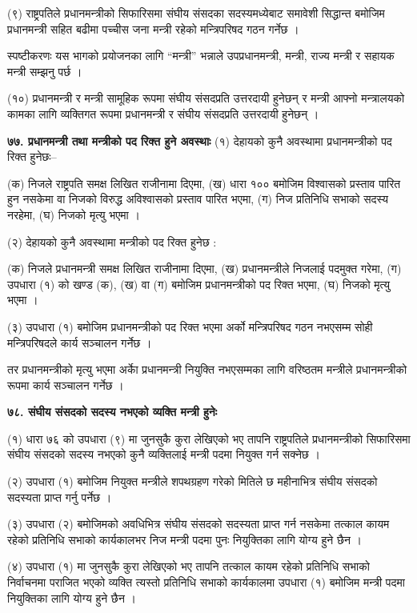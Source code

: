 (९) राष्ट्रपतिले प्रधानमन्त्रीको सिफारिसमा संघीय संसदका सदस्यमध्येबाट समावेशी सिद्धान्त बमोजिम प्रधानमन्त्री सहित बढीमा पच्चीस
जना मन्त्री रहेको मन्त्रिपरिषद गठन गर्नेछ ।

स्पष्टीकरणः यस भागको प्रयोजनका लागि “मन्त्री” भन्नाले उपप्रधानमन्त्री, मन्त्री, राज्य मन्त्री र सहायक मन्त्री सम्झनु पर्छ ।

(१०) प्रधानमन्त्री र मन्त्री सामूहिक रूपमा संघीय संसदप्रति उत्तरदायी हुनेछन् र मन्त्री आफ्नो मन्त्रालयको कामका लागि व्यक्तिगत रूपमा प्रधानमन्त्री र संघीय संसदप्रति उत्तरदायी हुनेछन् ।

\textbf{७७. प्रधानमन्त्री तथा मन्त्रीको पद रिक्त हुने अवस्थाः} (१) देहायको कुनै अवस्थामा प्रधानमन्त्रीको पद रिक्त हुनेछः–

(क) निजले राष्ट्रपति समक्ष लिखित राजीनामा दिएमा,
(ख) धारा १०० बमोजिम विश्वासको प्रस्ताव पारित हुन नसकेमा वा निजको विरुद्ध अविश्वासको प्रस्ताव पारित भएमा,
(ग) निज प्रतिनिधि सभाको सदस्य नरहेमा,
(घ) निजको मृत्यु भएमा ।

(२) देहायको कुनै अवस्थामा मन्त्रीको पद रिक्त हुनेछ :

(क) निजले प्रधानमन्त्री समक्ष लिखित राजीनामा दिएमा,
(ख) प्रधानमन्त्रीले निजलाई पदमुक्त गरेमा,
(ग) उपधारा (१) को खण्ड (क), (ख) वा (ग) बमोजिम प्रधानमन्त्रीको पद रिक्त भएमा,
(घ) निजको मृत्यु भएमा ।

(३) उपधारा (१) बमोजिम प्रधानमन्त्रीको पद रिक्त भएमा अर्को मन्त्रिपरिषद गठन नभएसम्म सोही मन्त्रिपरिषदले कार्य सञ्चालन गर्नेछ ।

तर प्रधानमन्त्रीको मृत्यु भएमा अर्काे प्रधानमन्त्री नियुक्ति नभएसम्मका लागि वरिष्ठतम मन्त्रीले प्रधानमन्त्रीको रूपमा कार्य सञ्चालन गर्नेछ ।

\textbf{७८. संघीय संसदको सदस्य नभएको व्यक्ति मन्त्री हुनेः}

(१) धारा ७६ को उपधारा (९) मा जुनसुकै कुरा लेखिएको भए तापनि राष्ट्रपतिले प्रधानमन्त्रीको सिफारिसमा संघीय संसदको सदस्य नभएको कुनै व्यक्तिलाई मन्त्री पदमा नियुक्त गर्न सक्नेछ ।

(२) उपधारा (१) बमोजिम नियुक्त मन्त्रीले शपथग्रहण गरेको मितिले छ महीनाभित्र संघीय संसदको सदस्यता प्राप्त गर्नु पर्नेछ ।

(३) उपधारा (२) बमोजिमको अवधिभित्र संघीय संसदको सदस्यता प्राप्त गर्न नसकेमा तत्काल कायम रहेको प्रतिनिधि सभाको कार्यकालभर निज मन्त्री पदमा पुनः नियुक्तिका लागि योग्य हुने छैन ।

(४) उपधारा (१) मा जुनसुकै कुरा लेखिएको भए तापनि तत्काल कायम रहेको प्रतिनिधि सभाको निर्वाचनमा पराजित भएको व्यक्ति त्यस्तो प्रतिनिधि सभाको कार्यकालमा उपधारा (१) बमोजिम मन्त्री पदमा नियुक्तिका लागि योग्य हुने छैन ।

